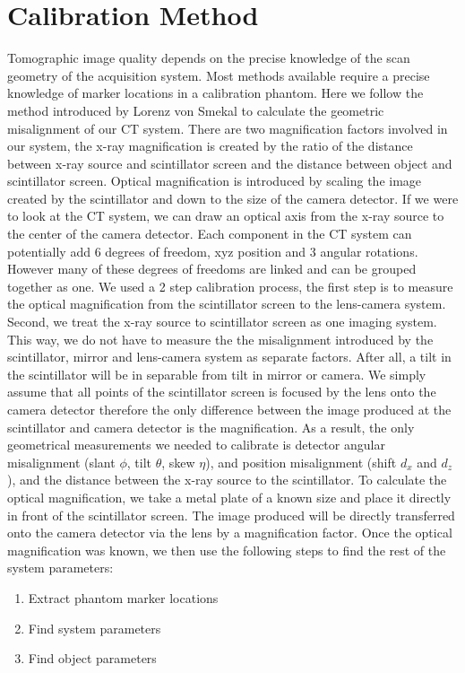 \section{Calibration Method}
Tomographic image quality depends on the precise knowledge of the scan geometry of the acquisition system. Most methods available require a precise knowledge of marker locations in a calibration phantom.  Here we follow the method introduced by Lorenz von Smekal to calculate the geometric misalignment of our CT system.  There are two magnification factors involved in our system, the x-ray magnification is created by the ratio of the distance between x-ray source and scintillator screen and the distance between object and scintillator screen.  Optical magnification is introduced by scaling the image created by the scintillator and down to the size of the camera detector.  If we were to look at the CT system, we can draw an optical axis from the x-ray source to the center of the camera detector. Each component in the CT system can potentially add 6 degrees of freedom, xyz position and 3 angular rotations.  However many of these degrees of freedoms are linked and can be grouped together as one.  We used a 2 step calibration process, the first step is to measure the optical magnification from the scintillator screen to the lens-camera system.  Second, we treat the x-ray source to scintillator screen as one imaging system. This way, we do not have to measure the the misalignment introduced by the scintillator, mirror and lens-camera system as separate factors. After all, a tilt in the scintillator will be in separable from tilt in mirror or camera.  We simply assume that all points of the scintillator screen is focused by the lens onto the camera detector therefore the only difference between the image produced at the scintillator and camera detector is the magnification.  As a result, the only geometrical measurements we needed to calibrate is detector angular misalignment (slant $\phi$, tilt $\theta$, skew $\eta$), and position misalignment (shift $d_x$ and $d_z$), and the distance between the x-ray source to the scintillator.
To calculate the optical magnification, we take a metal plate of a known size and place it directly in front of the scintillator screen.  The image produced will be directly transferred onto the camera detector via the lens by a magnification factor.  Once the optical magnification was known, we then use the following steps to find the rest of the system parameters:
\begin{enumerate}
\item Extract phantom marker locations
\item Find system parameters
\item Find object parameters
\end{enumerate}

